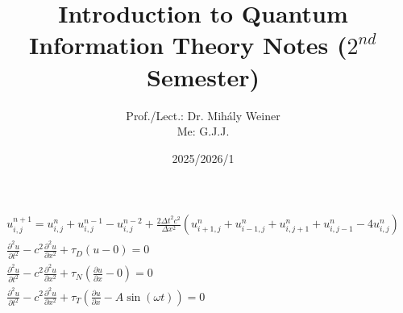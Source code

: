 \documentclass{article}
\title{Introduction to Quantum Information Theory Notes ($2^{nd}$ Semester)}
\author{Prof./Lect.: Dr. Mihály Weiner \\ Me: G.J.J.}
\date{2025/2026/1}
\newcommand{\pd}[2]{\frac{\partial #1}{\partial #2}}
\newcommand{\ijx}[0]{_{i,j}}
\numberwithin{equation}{section}
\begin{document}
\begin{align}
	u^{n+1}\ijx = u^n\ijx + u^{n-1}\ijx - u^{n-2}\ijx + \frac{2\Delta t^2 c^2}{\Delta x^2}( u^n_{i+1,j}+u^n_{i-1,j}+u^n_{i,j+1} + u^n_{i,j-1} - 4u^n\ijx ) \\
	\pd{^2u}{t^2} - c^2\pd{^2u}{x^2} + \tau_D(u-0) = 0 \\
	\pd{^2u}{t^2} - c^2\pd{^2u}{x^2} + \tau_N(\pd{u}{x}-0) = 0 \\
	\pd{^2u}{t^2} - c^2\pd{^2u}{x^2} + \tau_T(\pd{u}{x}-A\sin(\omega t)) = 0 
\end{align}
\end{document}
